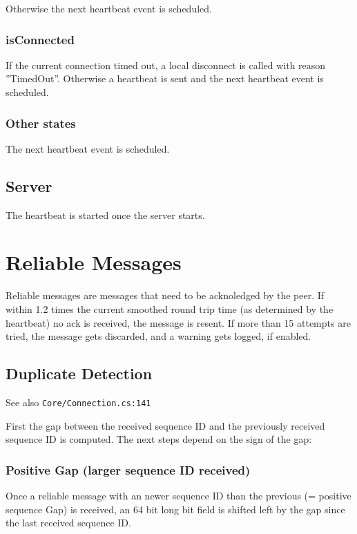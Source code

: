 Otherwise the next heartbeat event is scheduled.

\subsubsection{isConnected}

If the current connection timed out, a local disconnect is called with reason ''TimedOut''.
Otherwise a heartbeat is sent and the next heartbeat event is scheduled.

\subsubsection{Other states}

The next heartbeat event is scheduled.

\subsection{Server}

The heartbeat is started once the server starts.

\section{Reliable Messages}

Reliable messages are messages that need to be acknoledged by the peer. If within 1.2 times the current smoothed round trip time (as determined by the heartbeat) no ack is received, the message is resent. If more than 15 attempts are tried, the message gets discarded, and a warning gets logged, if enabled.

\subsection{Duplicate Detection}
See also \texttt{Core/Connection.cs:141}

First the gap between the received sequence ID and the previously received sequence ID is computed. The next steps depend on the sign of the gap:

\subsubsection{Positive Gap (larger sequence ID received)}

Once a reliable message with an newer sequence ID than the previous (= positive sequence Gap) is received, an 64 bit long bit field is shifted left by the gap since the last received sequence ID.


